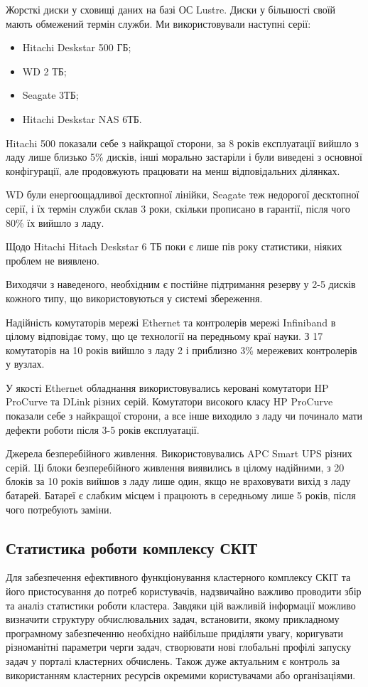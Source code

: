 Жорсткі диски у сховищі даних на базі ОС Lustre. Диски у більшості своїй мають обмежений термін служби. Ми використовували наступні серії:
\begin{itemize}
\item Hitachi Deskstar 500 ГБ;
\item WD 2 ТБ;
\item Seagate 3ТБ;
\item Hitachi Deskstar NAS 6ТБ.
\end{itemize}

Hitachi 500 показали себе з найкращої сторони, за 8 років експлуатації вийшло з ладу лише близько 5\% дисків, інші морально застаріли і були виведені з основної конфігурації, але продовжують працювати на менш відповідальних ділянках.

WD були енергоощадливої десктопної лінійки, Seagate теж недорогої десктопної серії, і їх термін служби склав 3 роки, скільки прописано в гарантії, після чого 80\% їх вийшло з ладу.

Щодо Hitachi Hitach Deskstar 6 ТБ поки є лише пів року статистики, ніяких проблем не виявлено.

Виходячи з наведеного, необхідним є постійне підтримання резерву у 2-5 дисків кожного типу, що використовуються у системі збереження.

Надійність комутаторів мережі Ethernet та контролерів мережі Infiniband в цілому відповідає тому, що це технології на передньому краї науки. З 17 комутаторів на 10 років вийшло з ладу 2 і приблизно 3\% мережевих контролерів у вузлах.

У якості Ethernet обладнання використовувались  керовані комутатори HP ProCurve та DLink різних серій. Комутатори високого класу HP ProCurve показали себе з найкращої сторони, а все інше виходило з ладу чи починало мати дефекти роботи після 3-5 років експлуатації. 

Джерела безперебійного живлення. Використовувались APC Smart UPS різних серій. Ці блоки безперебійного живлення виявились в цілому надійними, з 20 блоків за 10 років вийшов з ладу лише один, якщо не враховувати вихід з ладу батарей. Батареї є слабким місцем і працюють в середньому лише 5 років, після чого потребують заміни.

\subsection{Статистика роботи комплексу СКІТ}

Для забезпечення ефективного функціонування кластерного комплексу СКІТ та його пристосування до потреб користувачів, надзвичайно важливо проводити збір та аналіз статистики роботи кластера. Завдяки цій важливій інформації можливо  визначити структуру обчислювальних задач, встановити, якому прикладному програмному забезпеченню необхідно найбільше приділяти увагу, коригувати різноманітні параметри черги задач, створювати нові глобальні профілі запуску задач у порталі кластерних обчислень. Також дуже актуальним є контроль за використанням кластерних ресурсів окремими користувачами або організаціями.

